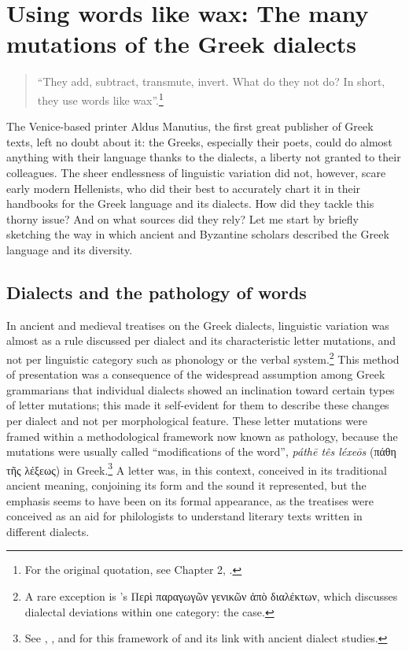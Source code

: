 \chapter{Using words like wax: The many mutations of the Greek dialects}\label{chap:6}

\begin{quote}
“They add, subtract, transmute, invert. What do they not do? In short, they use words like wax”.\footnote{{For the original  quotation, see Chapter 2, .}} 
\end{quote}

The Venice-based printer Aldus Manutius, the first great publisher of Greek texts, left no doubt about it: the Greeks, especially their poets, could do almost anything with their language thanks to the dialects, a liberty not granted to their  colleagues. The sheer endlessness of linguistic variation did not, however, scare early modern Hellenists, who did their best to accurately chart it in their handbooks for the Greek language and its dialects. How did they tackle this thorny issue? And on what sources did they rely? Let me start by briefly sketching the way in which ancient and Byzantine scholars described the Greek language and its diversity.

\section{Dialects and the pathology of words}\label{sec:6.1}

In ancient and medieval treatises on the Greek dialects, linguistic variation was almost as a rule discussed per dialect and its characteristic letter mutations, and not per linguistic category such as phonology or the verbal system.\footnote{{A rare exception is ’s Περὶ παραγωγῶν γενικῶν ἀπὸ διαλέκτων, which discusses dialectal deviations within one category: the  case.}} This method of presentation was a consequence of the widespread assumption among Greek grammarians that individual dialects showed an inclination toward certain types of letter mutations; this made it self-evident for them to describe these changes per dialect and not per morphological feature. These letter mutations were framed within a methodological framework now known as pathology, because the mutations were usually called “modifications of the word”, \textit{páthē tês léxeōs} (πάθη τῆς λέξεως) in Greek.\footnote{{See \citet{Wackernagel1876}, \citet[150]{Siebenborn1976}, and \citet[esp. 118]{Lallot1995} for this framework of  and its link with ancient dialect studies.}} A letter was, in this context, conceived in its traditional ancient meaning, conjoining its form and the sound it represented, but the emphasis seems to have been on its formal appearance, as the treatises were conceived as an aid for philologists to understand literary texts written in different dialects. 


